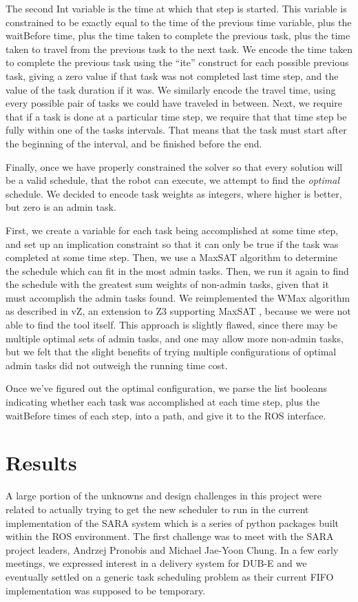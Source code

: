\documentclass[11pt]{article}
\begin{document}
The second Int variable
is the time at which that step is started.
This variable is constrained
to be exactly equal to the time
of the previous time variable,
plus the waitBefore time,
plus the time taken to complete the previous task,
plus the time taken to travel
from the previous task to the next task.
We encode the time taken to complete the previous task
using the ``ite'' construct for each possible previous task,
giving a zero value if that task was not completed last time step,
and the value of the task duration if it was.
We similarly encode the travel time,
using every possible pair of tasks we could have traveled in between.
Next, we require that if a task is done at a particular time step,
we require that that time step be fully within one of the tasks intervals.
That means that the task must start after the beginning of the interval,
and be finished before the end.

Finally, once we have properly constrained the solver
so that every solution will be a valid schedule,
that the robot can execute,
we attempt to find the \textit{optimal} schedule.
We decided to encode task weights as integers,
where higher is better,
but zero is an admin task.

First, we create a variable
for each task being accomplished
at some time step,
and set up an implication constraint
so that it can only be true
if the task was completed at some time step.
Then, we use a MaxSAT algorithm
to determine the schedule which can fit in the most admin tasks.
Then, we run it again to find the schedule with the greatest
sum weights of non-admin tasks,
given that it must accomplish the admin tasks found.
We reimplemented the WMax algorithm
as described in vZ, an extension to Z3 supporting MaxSAT \cite{vZ},
because we were not able to find the tool itself.
This approach is slightly flawed,
since there may be multiple optimal sets of admin tasks,
and one may allow more non-admin tasks,
but we felt that the slight benefits
of trying multiple configurations of optimal admin tasks
did not outweigh the running time cost.

Once we've figured out the optimal configuration,
we parse the list booleans
indicating whether each task was accomplished at each time step,
plus the waitBefore times of each step,
into a path, and give it to the ROS interface.


\section{Results}
A large portion of the unknowns and design
challenges in this project were related to
actually trying to get the new scheduler to
run in the current implementation of the SARA
system which is a series of python packages
built within the ROS environment. The first
challenge was to meet with the SARA project
leaders, Andrzej Pronobis and Michael Jae-Yoon
Chung. In a few early meetings, we expressed
interest in a delivery system for DUB-E and we
eventually settled on a generic task scheduling
problem as their current FIFO implementation was
supposed to be temporary.
\end{document}
